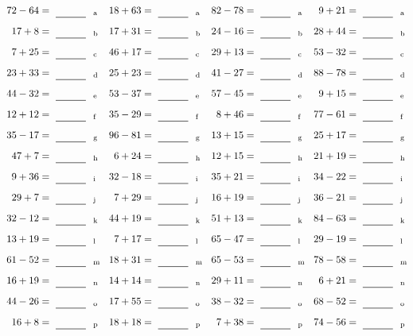 \documentclass
[
  draft    = true,
  fontsize = 11pt,
  parskip  = half-
]
{scrartcl}
\begin{document}
\clearpage
\begin{align*}
    \pline{72-64}&=\rline{a}
  & \pline{18+63}&=\rline{a}
  & \pline{82-78}&=\rline{a}
  & \pline{9+21}&=\rline{a} \\[1ex]
    \pline{17+8}&=\rline{b}
  & \pline{17+31}&=\rline{b}
  & \pline{24-16}&=\rline{b}
  & \pline{28+44}&=\rline{b} \\[1ex]
    \pline{7+25}&=\rline{c}
  & \pline{46+17}&=\rline{c}
  & \pline{29+13}&=\rline{c}
  & \pline{53-32}&=\rline{c} \\[1ex]
    \pline{23+33}&=\rline{d}
  & \pline{25+23}&=\rline{d}
  & \pline{41-27}&=\rline{d}
  & \pline{88-78}&=\rline{d} \\[1ex]
    \pline{44-32}&=\rline{e}
  & \pline{53-37}&=\rline{e}
  & \pline{57-45}&=\rline{e}
  & \pline{9+15}&=\rline{e} \\[1ex]
    \pline{12+12}&=\rline{f}
  & \pline{35-29}&=\rline{f}
  & \pline{8+46}&=\rline{f}
  & \pline{77-61}&=\rline{f} \\[1ex]
    \pline{35-17}&=\rline{g}
  & \pline{96-81}&=\rline{g}
  & \pline{13+15}&=\rline{g}
  & \pline{25+17}&=\rline{g} \\[1ex]
    \pline{47+7}&=\rline{h}
  & \pline{6+24}&=\rline{h}
  & \pline{12+15}&=\rline{h}
  & \pline{21+19}&=\rline{h} \\[1ex]
    \pline{9+36}&=\rline{i}
  & \pline{32-18}&=\rline{i}
  & \pline{35+21}&=\rline{i}
  & \pline{34-22}&=\rline{i} \\[1ex]
    \pline{29+7}&=\rline{j}
  & \pline{7+29}&=\rline{j}
  & \pline{16+19}&=\rline{j}
  & \pline{36-21}&=\rline{j} \\[1ex]
    \pline{32-12}&=\rline{k}
  & \pline{44+19}&=\rline{k}
  & \pline{51+13}&=\rline{k}
  & \pline{84-63}&=\rline{k} \\[1ex]
    \pline{13+19}&=\rline{l}
  & \pline{7+17}&=\rline{l}
  & \pline{65-47}&=\rline{l}
  & \pline{29-19}&=\rline{l} \\[1ex]
    \pline{61-52}&=\rline{m}
  & \pline{18+31}&=\rline{m}
  & \pline{65-53}&=\rline{m}
  & \pline{78-58}&=\rline{m} \\[1ex]
    \pline{16+19}&=\rline{n}
  & \pline{14+14}&=\rline{n}
  & \pline{29+11}&=\rline{n}
  & \pline{6+21}&=\rline{n} \\[1ex]
    \pline{44-26}&=\rline{o}
  & \pline{17+55}&=\rline{o}
  & \pline{38-32}&=\rline{o}
  & \pline{68-52}&=\rline{o} \\[1ex]
    \pline{16+8}&=\rline{p}
  & \pline{18+18}&=\rline{p}
  & \pline{7+38}&=\rline{p}
  & \pline{74-56}&=\rline{p}
\end{align*}
\end{document}
